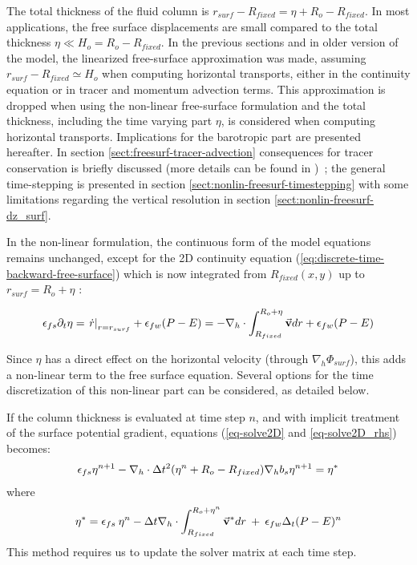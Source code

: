 The total thickness of the fluid column is $r_{surf} - R_{fixed} =
\eta + R_o - R_{fixed}$. In most applications, the free surface 
displacements are small compared to the total thickness
$\eta \ll H_o = R_o - R_{fixed}$. 
In the previous sections and in older version of the model,
the linearized free-surface approximation was made, assuming
$r_{surf} - R_{fixed} \simeq H_o$ when computing horizontal transports,
either in the continuity equation or in tracer and momentum 
advection terms.
This approximation is dropped when using the non-linear free-surface
formulation and the total thickness, including the time varying part
$\eta$, is considered when computing horizontal transports.
Implications for the barotropic part are presented hereafter.
In section \ref{sect:freesurf-tracer-advection} consequences for 
tracer conservation is briefly discussed (more details can be 
found in \cite{campin:02})~; the general time-stepping is presented 
in section \ref{sect:nonlin-freesurf-timestepping} with some 
limitations regarding the vertical resolution in section 
\ref{sect:nonlin-freesurf-dz_surf}.

In the non-linear formulation, the continuous form of the model 
equations remains unchanged, except for the 2D continuity equation 
(\ref{eq:discrete-time-backward-free-surface}) which is now
integrated from $R_{fixed}(x,y)$ up to $r_{surf}=R_o+\eta$ :

\begin{displaymath}
\epsilon_{fs} \partial_t \eta =
\left. \dot{r} \right|_{r=r_{surf}} + \epsilon_{fw} (P-E) =
- {\bf \nabla}_h \cdot \int_{R_{fixed}}^{R_o+\eta} \vec{\bf v} dr
+ \epsilon_{fw} (P-E)
\end{displaymath}

Since $\eta$ has a direct effect on the horizontal velocity (through
$\nabla_h \Phi_{surf}$), this adds a non-linear term to the free
surface equation. Several options for the time discretization of this
non-linear part can be considered, as detailed below.

If the column thickness is evaluated at time step $n$, and with
implicit treatment of the surface potential gradient, equations
(\ref{eq-solve2D} and \ref{eq-solve2D_rhs}) becomes:
\begin{eqnarray*}
\epsilon_{fs} {\eta}^{n+1} -
{\bf \nabla}_h \cdot \Delta t^2 (\eta^{n}+R_o-R_{fixed})
{\bf \nabla}_h b_s {\eta}^{n+1}
= {\eta}^*
\end{eqnarray*}
where
\begin{eqnarray*}
{\eta}^* = \epsilon_{fs} \: {\eta}^{n} -
\Delta t {\bf \nabla}_h \cdot \int_{R_{fixed}}^{R_o+\eta^n} \vec{\bf v}^* dr
\: + \: \epsilon_{fw} \Delta_t (P-E)^{n}
\end{eqnarray*} 
This method requires us to update the solver matrix at each time step.


